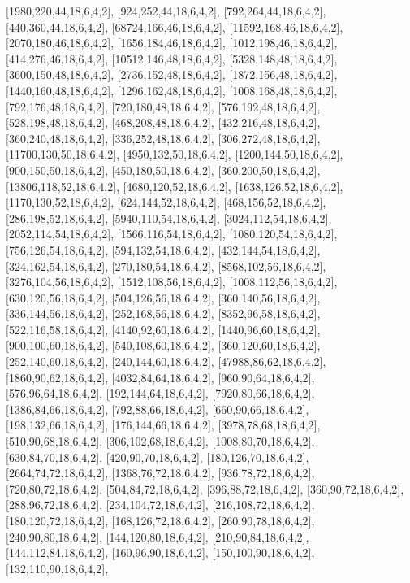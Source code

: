 \documentclass[12pt]{amsart}
\begin{document}
[1980,220,44,18,6,4,2],   [924,252,44,18,6,4,2],   [792,264,44,18,6,4,2],   [440,360,44,18,6,4,2],   [68724,166,46,18,6,4,2],   [11592,168,46,18,6,4,2],
[2070,180,46,18,6,4,2],   [1656,184,46,18,6,4,2],   [1012,198,46,18,6,4,2],   [414,276,46,18,6,4,2],   [10512,146,48,18,6,4,2],   [5328,148,48,18,6,4,2],
[3600,150,48,18,6,4,2],   [2736,152,48,18,6,4,2],   [1872,156,48,18,6,4,2],   [1440,160,48,18,6,4,2],   [1296,162,48,18,6,4,2],   [1008,168,48,18,6,4,2],
[792,176,48,18,6,4,2],   [720,180,48,18,6,4,2],   [576,192,48,18,6,4,2],   [528,198,48,18,6,4,2],   [468,208,48,18,6,4,2],   [432,216,48,18,6,4,2],
[360,240,48,18,6,4,2],   [336,252,48,18,6,4,2],   [306,272,48,18,6,4,2],   [11700,130,50,18,6,4,2],   [4950,132,50,18,6,4,2],   [1200,144,50,18,6,4,2],
[900,150,50,18,6,4,2],   [450,180,50,18,6,4,2],   [360,200,50,18,6,4,2],   [13806,118,52,18,6,4,2],   [4680,120,52,18,6,4,2],   [1638,126,52,18,6,4,2],
[1170,130,52,18,6,4,2],   [624,144,52,18,6,4,2],   [468,156,52,18,6,4,2],   [286,198,52,18,6,4,2],   [5940,110,54,18,6,4,2],   [3024,112,54,18,6,4,2],
[2052,114,54,18,6,4,2],   [1566,116,54,18,6,4,2],   [1080,120,54,18,6,4,2],   [756,126,54,18,6,4,2],   [594,132,54,18,6,4,2],   [432,144,54,18,6,4,2],
[324,162,54,18,6,4,2],   [270,180,54,18,6,4,2],   [8568,102,56,18,6,4,2],   [3276,104,56,18,6,4,2],   [1512,108,56,18,6,4,2],   [1008,112,56,18,6,4,2],
[630,120,56,18,6,4,2],   [504,126,56,18,6,4,2],   [360,140,56,18,6,4,2],   [336,144,56,18,6,4,2],   [252,168,56,18,6,4,2],   [8352,96,58,18,6,4,2],
[522,116,58,18,6,4,2],   [4140,92,60,18,6,4,2],   [1440,96,60,18,6,4,2],   [900,100,60,18,6,4,2],   [540,108,60,18,6,4,2],   [360,120,60,18,6,4,2],
[252,140,60,18,6,4,2],   [240,144,60,18,6,4,2],   [47988,86,62,18,6,4,2],   [1860,90,62,18,6,4,2],   [4032,84,64,18,6,4,2],   [960,90,64,18,6,4,2],   [576,96,64,18,6,4,2],
[192,144,64,18,6,4,2],   [7920,80,66,18,6,4,2],   [1386,84,66,18,6,4,2],   [792,88,66,18,6,4,2],   [660,90,66,18,6,4,2],   [198,132,66,18,6,4,2],   [176,144,66,18,6,4,2],
[3978,78,68,18,6,4,2],   [510,90,68,18,6,4,2],   [306,102,68,18,6,4,2],   [1008,80,70,18,6,4,2],   [630,84,70,18,6,4,2],   [420,90,70,18,6,4,2],   [180,126,70,18,6,4,2],
[2664,74,72,18,6,4,2],   [1368,76,72,18,6,4,2],   [936,78,72,18,6,4,2],   [720,80,72,18,6,4,2],   [504,84,72,18,6,4,2],   [396,88,72,18,6,4,2],   [360,90,72,18,6,4,2],
[288,96,72,18,6,4,2],   [234,104,72,18,6,4,2],   [216,108,72,18,6,4,2],   [180,120,72,18,6,4,2],   [168,126,72,18,6,4,2],   [260,90,78,18,6,4,2],   [240,90,80,18,6,4,2],
[144,120,80,18,6,4,2],   [210,90,84,18,6,4,2],   [144,112,84,18,6,4,2],   [160,96,90,18,6,4,2],   [150,100,90,18,6,4,2],   [132,110,90,18,6,4,2],
\end{document}
